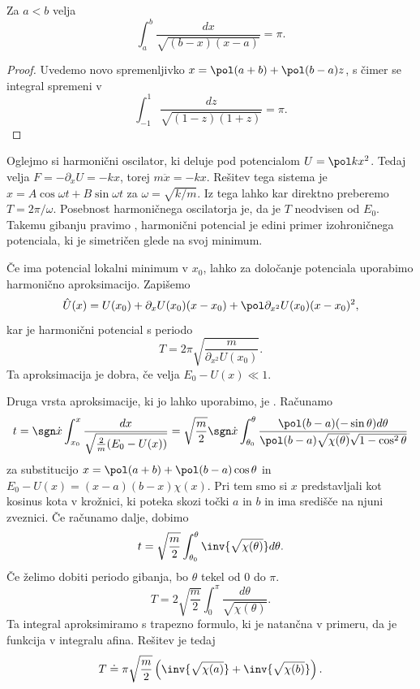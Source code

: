 
\begin{lema}
  Za $a < b$ velja
  \[
	\int_a^b \frac{dx}{\sqrt{(b-x) (x-a)}} = \pi.
  \]
\end{lema}

\begin{proof}
  Uvedemo novo spremenljivko $x = \pol (a+b) + \pol (b-a) z$, s čimer se
  integral spremeni v
  \[
	\int_{-1}^1 \frac{dz}{\sqrt{(1-z)(1+z)}}
	= \pi.
  \]
\end{proof}

\begin{primer}
  Oglejmo si harmonični oscilator, ki deluje pod potencialom $U = \pol k x^2$.
  Tedaj velja $F = - \partial_x U = -kx$, torej $m\ddot{x} = -kx$.
  Rešitev tega sistema je $x = A \cos \omega t + B \sin \omega t$ za
  $\omega = \sqrt{k/m}$.
  Iz tega lahko kar direktno preberemo $T = 2 \pi / \omega$.
  Posebnost harmoničnega oscilatorja je, da je $T$ neodvisen od $E_0$.
  Takemu gibanju pravimo , harmonični potencial je edini
  primer izohroničnega potenciala, ki je simetričen glede na svoj minimum.
\end{primer}

Če ima potencial lokalni minimum v $x_0$, lahko za določanje potenciala
uporabimo harmonično aproksimacijo.
Zapišemo
\[
  \hat{U}(x) = U(x_0) + \partial_x U(x_0) (x-x_0) + \pol \partial_{x^2}
  U(x_0) (x - x_0)^2,
\]
kar je harmonični potencial s periodo
\[
  T = 2 \pi \sqrt{\frac{m}{\partial_{x^2} U(x_0)}}.
\]
Ta aproksimacija je dobra, če velja $E_0 - U(x) \ll 1$.


Druga vrsta aproksimacije, ki jo lahko uporabimo, je .
Računamo
\[
  t = \sgn \dot{x} \int_{x_0}^x \frac{dx}{\sqrt{ \frac{2}{m} (E_0 - U(x)) }}
  = \sqrt{\frac{m}{2}} \sgn \dot{x}
  \int_{\theta_0}^{\theta} \frac{\pol (b-a) (-\sin \theta) d\theta}{\pol (b-a)
	\sqrt{\chi(\theta)} \sqrt{1 - \cos^2 \theta}}
\]
za substitucijo $x = \pol (a+b) + \pol (b-a) \cos\theta$ in $E_0 - U(x) =
(x-a)(b-x) \chi(x)$.
Pri tem smo si $x$ predstavljali kot kosinus kota v krožnici, ki poteka skozi
točki $a$ in $b$ in ima središče na njuni zveznici.
Če računamo dalje, dobimo
\[
  t = \sqrt{\frac{m}{2}} \int_{\theta_0}^{\theta} \inv{\sqrt{\chi(\theta)}}
  d\theta.
\]
Če želimo dobiti periodo gibanja, bo $\theta$ tekel od $0$ do $\pi$.
\[
  T = 2 \sqrt{\frac{m}{2}} \int_0^\pi \frac{d\theta}{\sqrt{\chi(\theta)}}.
\]
Ta integral aproksimiramo s trapezno formulo, ki je natančna v primeru, da je
funkcija v integralu afina.
Rešitev je tedaj
\[
  T \doteq \pi \sqrt{\frac{m}{2}} \left( \inv{\sqrt{\chi(a)}} +
	\inv{\sqrt{\chi(b)}} \right).
\]

